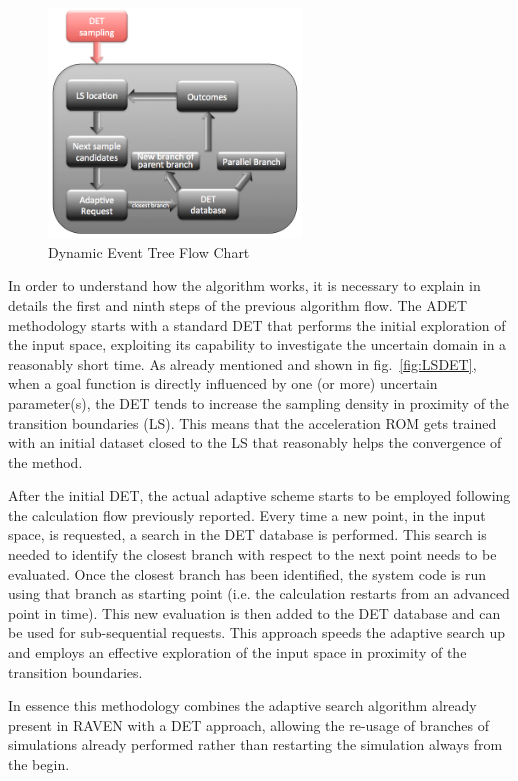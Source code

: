 \begin{figure}[h]
  \centering
     \includegraphics[width=0.6\textwidth]{figures/adaptiveFlowChart.png}
  \caption{Dynamic Event Tree Flow Chart}
  \label{fig:ADETflowChart}
\end{figure}

In order to understand how the algorithm works, it is necessary to explain in details the first and ninth steps of the previous algorithm flow. The ADET methodology starts with a standard DET that performs the initial exploration of the input space, exploiting its capability to investigate the uncertain domain in a reasonably short time. As already mentioned and shown in fig.~\ref{fig:LSDET}, when a goal function is directly influenced by one (or more) uncertain parameter(s), the DET tends to increase the sampling density in proximity of the transition boundaries (LS). This means that the acceleration ROM gets trained with an initial dataset closed to the LS that reasonably helps the convergence of the method.

After the initial DET, the actual adaptive scheme starts to be employed following the calculation flow previously reported. Every time a new point, in the input space, is requested, a search in the DET database is performed. This search is needed to identify the closest branch with respect to the next point needs to be evaluated. Once the closest branch has been identified, the system code is run using that branch as starting point (i.e. the calculation restarts from an advanced point in time). This new evaluation is then added to the DET database and can be used for sub-sequential requests. This approach speeds the adaptive search up and employs an effective exploration of the input space in proximity of the transition boundaries.

In essence this methodology combines the adaptive search algorithm already present in RAVEN with a DET approach, allowing the re-usage of branches of simulations already performed rather than restarting the simulation always from the begin.



